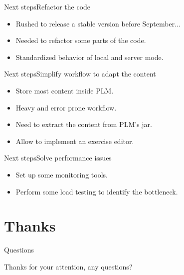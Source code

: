 \documentclass{beamer}
\begin{document}
\begin{frame}{Next steps}{Refactor the code}
  \begin{itemize}
  \item {
    Rushed to release a stable version before September...
  }
  \item {
    Needed to refactor some parts of the code.
  }
  \item {
    Standardized behavior of local and server mode.
  }
  \end{itemize}
\end{frame}

\begin{frame}{Next steps}{Simplify workflow to adapt the content}
  \begin{itemize}
  \item {
    Store most content inside PLM.
  }
  \item {
    Heavy and error prone workflow.
  }
  \item {
    Need to extract the content from PLM's jar.
  }
  \item {
    Allow to implement an exercise editor.
  }
  \end{itemize}
\end{frame}
  
\begin{frame}{Next steps}{Solve performance issues}
  \begin{itemize}
  \item {
    Set up some monitoring tools.
  }
  \item {
    Perform some load testing to identify the bottleneck.
  }
  \end{itemize}
\end{frame}

\section*{Thanks}

\begin{frame}{Questions}
  \begin{center}
    Thanks for your attention, any questions?
  \end{center}
\end{frame}
\end{document}
